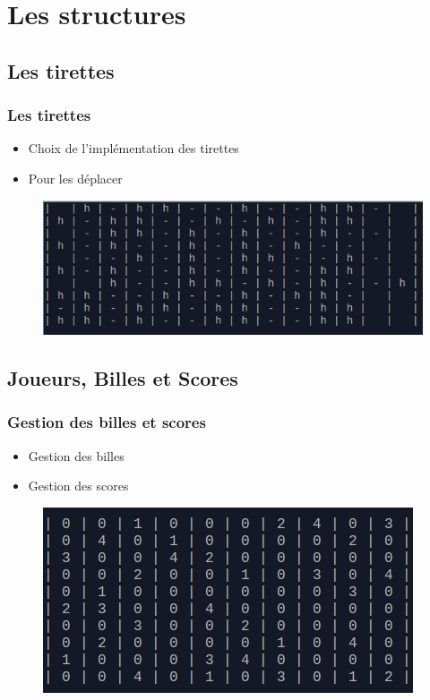 \section{Les structures}

	\subsection{Les tirettes}
		\begin{frame}
		    \frametitle{\textbf{Les tirettes}}
			\begin{itemize}
				 \item Choix de l'implémentation des tirettes
				 \item Pour les déplacer
			\end{itemize}
			\begin{figure}[h]
				\centering
				\includegraphics[scale=0.50]{images/tirette/tirette_horizontale.png}
			\end{figure}
		\end{frame}

\subsection{Joueurs, Billes et Scores}
	\begin{frame}
		\frametitle{\textbf{Gestion des billes et scores}}
		\begin{itemize}
			\item Gestion des billes
			\item Gestion des scores
		\end{itemize}
		\begin{figure}[h]
			\centering
			\includegraphics[scale=0.45]{images/boule/boule.png}
		\end{figure}
	\end{frame}
